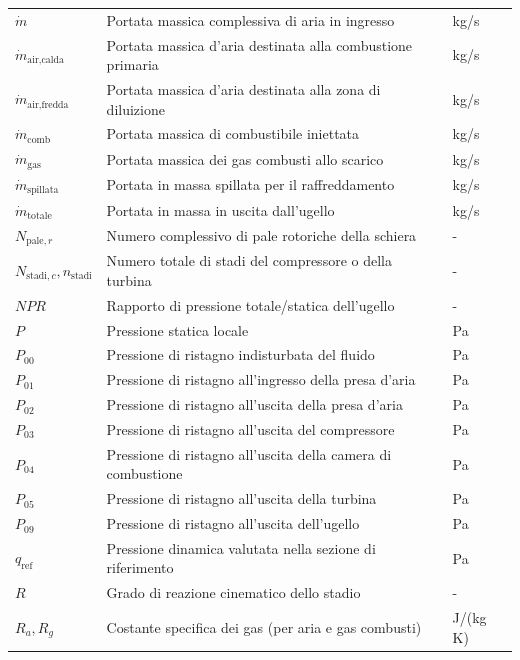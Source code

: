 \begin{longtable}{p{} p{} p{}}
    $\dot{m}$ & Portata massica complessiva di aria in ingresso & kg/s \\[2px]
    $\dot{m}_{\text{air,calda}}$ & Portata massica d'aria destinata alla combustione primaria & kg/s \\[2px]
    $\dot{m}_{\text{air,fredda}}$ & Portata massica d'aria destinata alla zona di diluizione & kg/s \\[2px]
    $\dot{m}_{\text{comb}}$ & Portata massica di combustibile iniettata & kg/s \\[2px]
    $\dot{m}_{\text{gas}}$ & Portata massica dei gas combusti allo scarico & kg/s \\[2px]
    $\dot{m}_{\text{spillata}}$ & Portata in massa spillata per il raffreddamento & kg/s \\[2px]
    $\dot{m}_{\text{totale}}$ & Portata in massa in uscita dall'ugello & kg/s \\[2px]
    $N_{\text{pale},r}$ & Numero complessivo di pale rotoriche della schiera & - \\[2px]
    $N_{\text{stadi},c}, n_{\text{stadi}}$ & Numero totale di stadi del compressore o della turbina & - \\[2px]
    $NPR$ & Rapporto di pressione totale/statica dell'ugello & - \\[2px]
    $P$ & Pressione statica locale & Pa \\[2px]
    $P_{00}$ & Pressione di ristagno indisturbata del fluido & Pa \\[2px]
    $P_{01}$ & Pressione di ristagno all'ingresso della presa d'aria & Pa \\[2px]
    $P_{02}$ & Pressione di ristagno all'uscita della presa d'aria & Pa \\[2px]
    $P_{03}$ & Pressione di ristagno all'uscita del compressore & Pa \\[2px]
    $P_{04}$ & Pressione di ristagno all'uscita della camera di combustione & Pa \\[2px]
    $P_{05}$ & Pressione di ristagno all'uscita della turbina & Pa \\[2px]
    $P_{09}$ & Pressione di ristagno all'uscita dell'ugello & Pa \\[2px]
    $q_{\text{ref}}$ & Pressione dinamica valutata nella sezione di riferimento & Pa \\[2px]
    $R$ & Grado di reazione cinematico dello stadio & - \\[2px]
    $R_a, R_g$ & Costante specifica dei gas (per aria e gas combusti) & J/(kg K) \\[2px]

\end{longtable}
